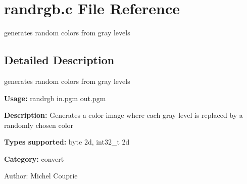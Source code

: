 \section{randrgb.c File Reference}
\label{randrgb_8c}
generates random colors from gray levels  




\label{_details}
\subsection{Detailed Description}
generates random colors from gray levels 

{\bf Usage:} randrgb in.pgm out.pgm

{\bf Description:} Generates a color image where each gray level is replaced by a randomly chosen color

{\bf Types supported:} byte 2d, int32\_\-t 2d

{\bf Category:} convert

\begin{Desc}
\item[Author:]Michel Couprie \end{Desc}
